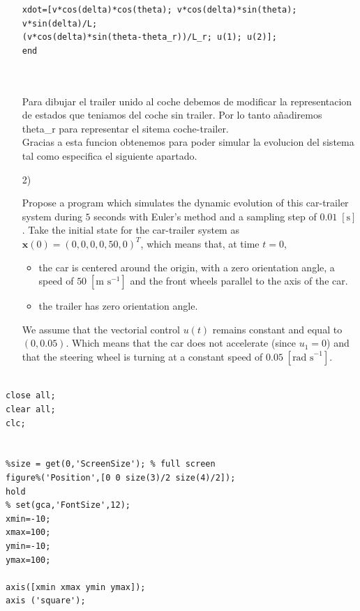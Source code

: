 \documentclass{article}
\begin{document}
\begin{itemize}
\begin{tcolorbox}
\begin{scriptsize}
\begin{verbatim}
xdot=[v*cos(delta)*cos(theta); v*cos(delta)*sin(theta); v*sin(delta)/L; 
(v*cos(delta)*sin(theta-theta_r))/L_r; u(1); u(2)];
end



\end{verbatim}
\end{scriptsize}
\end{tcolorbox}

\bigskip

Para dibujar el trailer unido al coche debemos de modificar la representacion de estados que teniamos del coche sin trailer. Por lo tanto añadiremos theta\_r para representar el sitema coche-trailer. \\
Gracias a esta funcion obtenemos  para poder simular la evolucion del sistema tal como especifica el siguiente apartado. 


\item[2)] 
{\color{gray}
Propose a program which simulates the dynamic evolution of this car-trailer system during $5$ seconds with
Euler's method and a sampling step of $0.01 \; [\text{s}]$. Take the initial state for the car-trailer system as $\mathbf{x}(0) =
(0, 0, 0, 0, 50, 0)^T$, which means that, at time $t = 0$,

\begin{itemize}

\item
the car is centered around the origin, with a zero orientation angle, a speed of $50 \; [\text{m s}^{-1}]$ and the front wheels parallel to the axis of the car. 

\item
 the trailer has zero orientation angle. 

\end{itemize}

We assume
that the vectorial control $u(t)$ remains constant and equal to $(0, 0.05)$. Which means that the car
does not accelerate (since $u_1 = 0$) and that the steering wheel is turning at a constant speed of
$0.05 \; [\text{rad s}^{-1}]$.
}
\end{itemize}




\bigskip





\begin{tcolorbox}
[
title={File \texttt{init.m}}
]
\begin{scriptsize}
\begin{verbatim}

close all; 
clear all; 
clc;

 
%size = get(0,'ScreenSize'); % full screen
figure%('Position',[0 0 size(3)/2 size(4)/2]);
hold
% set(gca,'FontSize',12);
xmin=-10;
xmax=100;
ymin=-10;
ymax=100;

axis([xmin xmax ymin ymax]); 
axis ('square');


\end{verbatim}
\end{scriptsize}
\end{tcolorbox}
\end{document}
